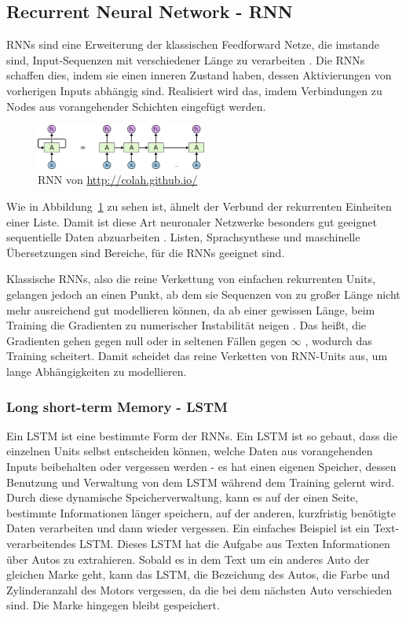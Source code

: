 \documentclass[pdftex,a4paper,halfparskip, article]{scrartcl}
\begin{document}
\subsection{Recurrent Neural Network - RNN}

RNNs sind eine Erweiterung der klassischen Feedforward Netze, die imstande sind, Input-Sequenzen mit verschiedener Länge zu verarbeiten \cite{paperGRUComparison}. Die RNNs schaffen dies, indem sie einen inneren Zustand haben, dessen Aktivierungen von vorherigen Inputs abhängig sind. Realisiert wird das, imdem Verbindungen zu Nodes aus vorangehender Schichten eingefügt werden.

\begin{figure}[h]
\centering
\includegraphics[width=0.5\textwidth]{colah_rnn}
\caption{RNN von \url{http://colah.github.io/}}
\label{fig:rnn}
\end{figure}

Wie in Abbildung~\ref{fig:rnn} zu sehen ist, ähnelt der Verbund der rekurrenten Einheiten einer Liste. Damit ist diese Art neuronaler Netzwerke besonders gut geeignet sequentielle Daten abzuarbeiten \cite{colahsBlogLSTM}. Listen, Sprachsynthese und maschinelle Übersetzungen sind Bereiche, für die RNNs geeignet sind. 

Klassische RNNs, also die reine Verkettung von einfachen rekurrenten Units, gelangen jedoch an einen Punkt, ab dem sie Sequenzen von zu großer Länge nicht mehr ausreichend gut modellieren können, da ab einer gewissen Länge, beim Training die Gradienten zu numerischer Instabilität neigen \cite{DBLP:journals/corr/Graves13}. Das heißt, die Gradienten gehen gegen null oder in seltenen Fällen gegen $\infty$ \cite{paperGRUComparison}, wodurch das Training scheitert. Damit scheidet das reine Verketten von RNN-Units aus, um lange Abhängigkeiten zu modellieren.  

\subsubsection{Long short-term Memory - LSTM}

Ein LSTM ist eine bestimmte Form der RNNs. Ein LSTM ist so gebaut, dass die einzelnen Units selbst entscheiden können, welche Daten aus vorangehenden Inputs beibehalten oder vergessen werden - es hat einen eigenen Speicher, dessen Benutzung und Verwaltung von dem LSTM während dem Training gelernt wird. Durch diese dynamische Speicherverwaltung, kann es auf der einen Seite, bestimmte Informationen länger speichern, auf der anderen, kurzfristig benötigte Daten verarbeiten und dann wieder vergessen. Ein einfaches Beispiel ist ein Text-verarbeitendes LSTM. Dieses LSTM hat die Aufgabe aus Texten Informationen über Autos zu extrahieren. Sobald es in dem Text um ein anderes Auto der gleichen Marke geht, kann das LSTM, die Bezeichung des Autos, die Farbe und Zylinderanzahl des Motors vergessen, da die bei dem nächsten Auto verschieden sind. Die Marke hingegen bleibt gespeichert. 
\end{document}
